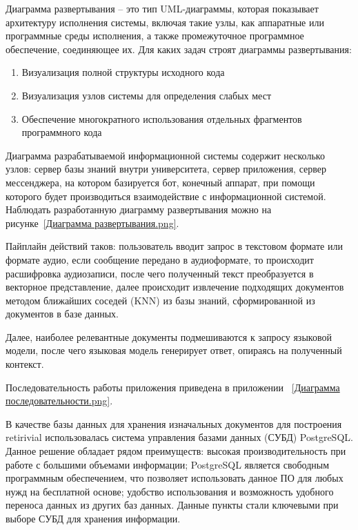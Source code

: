 Диаграмма развертывания – это тип UML-диаграммы, которая показывает архитектуру
исполнения системы, включая такие узлы, как аппаратные или программные среды
исполнения, а также промежуточное программное обеспечение, соединяющее их. 
Для каких задач строят диаграммы развертывания:

\begin{enumerate}
    \item Визуализация полной структуры исходного кода
    \item Визуализация узлов системы для определения слабых мест
    \item Обеспечение многократного использования отдельных фрагментов
        программного кода
\end{enumerate}

Диаграмма разрабатываемой информационной системы содержит несколько узлов: 
сервер базы знаний внутри университета, сервер приложения, сервер мессенджера,
на котором базируется бот, конечный аппарат, при помощи которого будет 
производиться взаимодействие с информационной системой. Наблюдать разработанную
диаграмму развертывания можно на рисунке~\ref{Диаграмма развертывания.png}.




Пайплайн действий таков: пользователь вводит запрос в текстовом формате или 
формате аудио, если сообщение передано в аудиоформате, то происходит 
расшифровка аудиозаписи, после чего полученный текст преобразуется в векторное
представление, далее происходит извлечение подходящих документов методом
ближайших соседей (KNN) из базы знаний, сформированной из документов в базе 
данных.

Далее, наиболее релевантные документы подмешиваются к запросу языковой модели,
после чего языковая модель генерирует ответ, опираясь на полученный контекст.

Последовательность работы приложения приведена в приложении
~\ref{Диаграмма последовательности.png}.


В качестве базы данных для хранения изначальных документов для построения 
retirivial использовалась система управления базами данных (СУБД) PostgreSQL\@.
Данное решение обладает рядом преимуществ: высокая производительность при 
работе с большими объемами информации; PostgreSQL является свободным 
программным обеспечением, что позволяет использовать данное ПО для любых 
нужд на бесплатной основе; удобство использования и возможность удобного 
переноса данных из других баз данных. Данные пункты стали ключевыми при выборе 
СУБД для хранения информации. 

